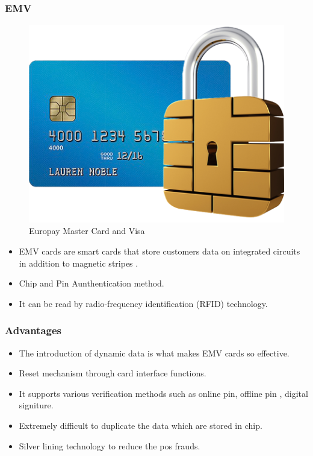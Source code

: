 \documentclass[handout]{beamer}
\begin{document}
\begin{frame}
\frametitle{EMV}
\begin{figure}[h]
\begin{center}
\includegraphics[scale=0.2,angle=360]{img3.png}
\caption{Europay Master Card and Visa}
\end{center}
\end{figure}
\begin{itemize}
\item EMV cards are smart cards that store customers data on integrated circuits in addition to magnetic stripes .
\item Chip and Pin Aunthentication method.
\item It can be read by radio-frequency identification (RFID) technology. 


\end{itemize}
\end{frame}






\begin{frame}
\frametitle{Advantages}
\begin{itemize}
\item The introduction of dynamic data is what makes EMV cards so effective.
\item Reset mechanism through card interface functions.
\item It supports various verification methods such as online pin, offline pin , digital signiture.
\item Extremely difficult to duplicate the data which are stored in chip. 
\item Silver lining technology to reduce the pos frauds.
\end{itemize}
\end{frame}
\end{document}
